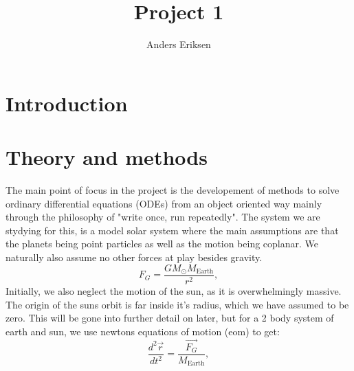 \documentclass[10pt, twocolumn]{revtex4-1}
\begin{document}
\title{Project 1}
\author{Anders Eriksen}
\maketitle


\section{Introduction}

\section{Theory and methods}

The main point of focus in the project is the developement of methods to
solve ordinary differential equations (ODEs) from an object oriented way
mainly through the philosophy of "write once, run repeatedly". The system
we are stydying for this, is a model solar system where the main assumptions
are that the planets being point particles as well as the motion being coplanar. 
We naturally also assume no other forces at play besides gravity. 
\[
F_G=\frac{GM_{\odot}M_{\mathrm{Earth}}}{r^2},
\]
Initially, we also neglect the motion of the sun, as it is overwhelmingly massive.
The origin of the suns orbit is far inside it's radius, which we have assumed to be 
zero. This will be gone into further detail on later, but for a 2 body system of earth 
and sun, we use newtons equations of motion (eom) to get: 
\[
    \frac{d^2\vec{r}}{dt^2}=\frac{\vec{F_{G}}}{M_{\mathrm{Earth}}},
\]
\end{document}
